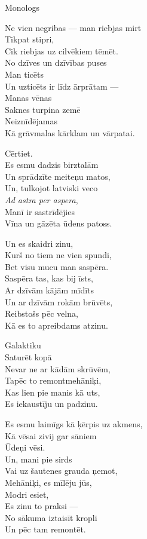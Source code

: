 \documentclass[14pt]{extarticle}
\begin{document}
{\large \sc Monologs}

Ne vien negribas --- man riebjas mirt\\
Tikpat stipri,\\
Cik riebjas uz cilvēkiem tēmēt.\\
No dzīves un dzīvības puses\\
Man ticēts\\
Un uzticēts ir līdz ārprātam ---\\
Manas vēnas\\
Saknes turpina zemē\\
Neiznīdējamas\\
Kā grāvmalas kārklam un vārpatai.

Cērtiet.\\
Es esmu dadzis birztalām\\
Un sprādzīte meiteņu matos,\\
Un, tulkojot latviski veco\\
{\em Ad astra per aspera},\\
Manī ir sastrīdējies\\
Vīna un gāzēta ūdens patoss.

Un es skaidri zinu,\\
Kurš no tiem ne vien spundi,\\
Bet visu mucu man saspēra.\\
Saspēra tas, kas bij īsts,\\
Ar dzīvām kājām mīdīts\\
Un ar dzīvām rokām brūvēts,\\
Reibstošs pēc velna,\\
Kā es to apreibdams atzinu.

Galaktiku\\
Saturēt kopā\\
Nevar ne ar kādām skrūvēm,\\
Tapēc to remontmehāniķi,\\
Kas lien pie manis kā uts,\\
Es iekaustīju un padzinu.

Es esmu laimīgs kā ķērpis uz akmens,\\
Kā vēsai zivij gar sāniem\\
Ūdeņi vēsi.\\
Un, mani pie sirds\\
Vai uz šautenes grauda ņemot,\\
Mehāniķi, es mīlēju jūs,\\
Modri esiet,\\
Es zinu to praksi ---\\
No sākuma iztaisīt kropli\\
Un pēc tam remontēt.
\end{document}
